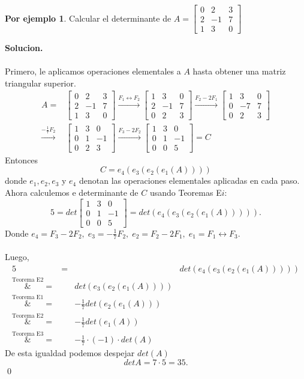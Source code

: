 \documentclass{article}
\theoremstyle{definition}
\theoremstyle{definition}
\newtheorem*{ej}{Por ejemplo}
\theoremstyle{remark}
\begin{document}
\begin{ej}
  Calcular el determinante de $A=\begin{bmatrix} 0 & 2 & 3 \\ 2 & -1 & 7 \\ 1 & 3 & 0 \end{bmatrix}$
\end{ej}
\textbf{Solucion.}\\\\
Primero, le aplicamos operaciones elementales a $A$ hasta obtener una matriz triangular superior. \[
  \begin{aligned}
    A=&\begin{bmatrix}0 & 2 & 3 \\ 2 & -1 & 7 \\ 1 & 3 & 0 \end{bmatrix} \xrightarrow{F_1 \leftrightarrow F_2} \begin{bmatrix}1 & 3 & 0 \\ 2 & -1 & 7 \\ 0 & 2 & 3 \end{bmatrix} \xrightarrow{F_2-2F_1} \begin{bmatrix} 1 & 3 & 0 \\ 0 & -7 & 7 \\ 0 & 2 & 3 \end{bmatrix} \\
    \xrightarrow{-\frac{1}{7}F_2} & \begin{bmatrix} 1 & 3 & 0 \\ 0 & 1 & -1 \\ 0 & 2 & 3 \end{bmatrix} \xrightarrow{F_3-2F_2}\begin{bmatrix}1 & 3 & 0 \\ 0 & 1 & -1 \\ 0 & 0 & 5 \end{bmatrix} =C
  \end{aligned}
\]
Entonces \[
C=e_4(e_3(e_2(e_1(A))))
\]donde $e_1, e_2, e_3$ y $e_4$ denotan las operaciones elementales aplicadas en cada paso. Ahora calculemos e determinante de $C$ usando Teoremas E$i$: \[
5=det\begin{bmatrix}1 & 3 & 0 \\ 0 & 1 & -1 \\ 0 & 0 & 5 \end{bmatrix} = det(e_4(e_3(e_2(e_1(A))))).
\]Donde $e_4=F_3-2F_2,\;e_3=-\frac{1}{7}F_2,\;e_2=F_2-2F_1,\;e_1=F_1\leftrightarrow F_3.$\\\\
Luego, \[
  \begin{aligned}
    5 &=&& det(e_4(e_3(e_2(e_1(A))))) \\
    \overset{\text{Teorema E2}}&{=}&& det(e_3(e_2(e_1(A)))) \\
    \overset{\text{Teorema E1}}&{=}&&-\frac{1}{7}det(e_2(e_1(A))) \\
    \overset{\text{Teorema E2}}&{=} &&-\frac{1}{7}det(e_1(A))\\
    \overset{\text{Teorema E3}}&{=} &&-\frac{1}{7}\cdot (-1)\cdot det(A)
  \end{aligned}
\]
De esta igualdad podemos despejar $det(A)$ \[
detA=7 \cdot 5 = 35. 
\]
\qed\pagebreak
\end{document}
